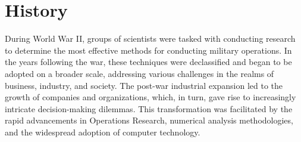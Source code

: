 \section{History}

During World War II, groups of scientists were tasked with conducting research to determine the most effective methods for conducting military operations. 
In the years following the war, these techniques were declassified and began to be adopted on a broader scale, addressing various challenges in the realms of business, industry, and society. 
The post-war industrial expansion led to the growth of companies and organizations, which, in turn, gave rise to increasingly intricate decision-making dilemmas. 
This transformation was facilitated by the rapid advancements in Operations Research, numerical analysis methodologies, and the widespread adoption of computer technology.
